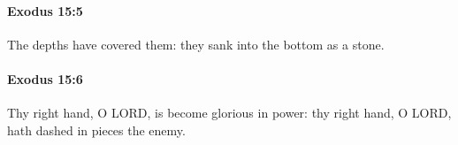 		\paragraph{Exodus 15:5} %
			\label{EXODUS-15-5}

			The depths have covered them: they sank into the bottom as a stone.


		\paragraph{Exodus 15:6} %
			\label{EXODUS-15-6}

			Thy right hand, O LORD, is become glorious in power: thy right hand, O LORD, hath dashed in pieces the enemy.


